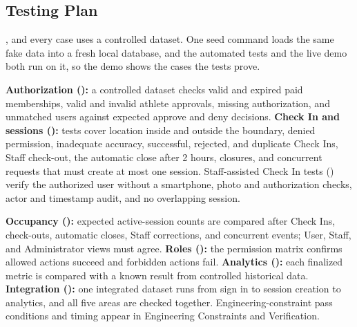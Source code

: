 \subsection{Testing Plan}

, and every case uses a controlled dataset. One seed command loads the same fake data into a fresh local database, and the automated tests and the live demo both run on it, so the demo shows the cases the tests prove.

\textbf{Authorization ():} a controlled dataset checks valid and expired paid memberships, valid and invalid athlete approvals, missing authorization, and unmatched users against expected approve and deny decisions. \textbf{Check In and sessions ():} tests cover location inside and outside the boundary, denied permission, inadequate accuracy, successful, rejected, and duplicate Check Ins, Staff check-out, the automatic close after 2 hours, closures, and concurrent requests that must create at most one session. Staff-assisted Check In tests () verify the authorized user without a smartphone, photo and authorization checks, actor and timestamp audit, and no overlapping session.

\textbf{Occupancy ():} expected active-session counts are compared after Check Ins, check-outs, automatic closes, Staff corrections, and concurrent events; User, Staff, and Administrator views must agree. \textbf{Roles ():} the permission matrix confirms allowed actions succeed and forbidden actions fail. \textbf{Analytics ():} each finalized metric is compared with a known result from controlled historical data. \textbf{Integration ():} one integrated dataset runs from sign in to session creation to analytics, and all five areas are checked together. Engineering-constraint pass conditions and timing appear in Engineering Constraints and Verification.


